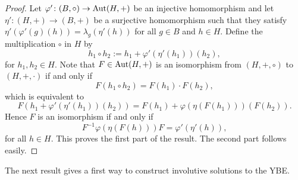 \begin{proof}
Let $\varphi'\colon
(B,\circ)\to \operatorname{Aut}(H,+)$ be an injective homomorphism and
let $\eta'\colon (H,+)\to (B,+)$ be a surjective homomorphism
such that they satisfy $\eta'(\varphi'(g)(h))=\lambda_g(\eta'(h))$ for
all $g\in B$ and $h\in H$. Define the multiplication $\circ$ in $H$ 
by
$$h_1\circ h_2:=h_1+\varphi'(\eta' (h_1))(h_2),$$
for $h_1,h_2\in H$. Note that $F\in\operatorname{Aut}(H,+)$ is an isomorphism from $(H,+,\circ)$ to $(H,+,\cdot)$ if and only if
$$F(h_1\circ h_2)=F(h_1)\cdot F(h_2),$$
which is equivalent to
$$F(h_1+\varphi'(\eta' (h_1))(h_2))=F(h_1)+\varphi(\eta (F(h_1)))(F(h_2)).$$
Hence $F$ is an isomorphism if and only if 
$$F^{-1}\varphi(\eta(F(h))) F=\varphi'(\eta'(h)),$$
for all $h\in H$. This proves the first part of the result. The second part follows easily.
\end{proof}	



The next result gives a first way to construct
involutive solutions to the YBE. 

